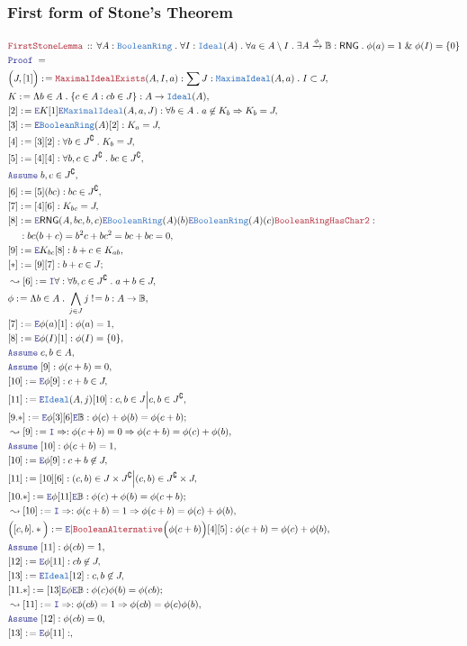 \documentclass[12pt]{scrartcl}
\newcommand{\TYPE}[1]{\textcolor{NavyBlue}{\mathtt{#1}}}
\newcommand{\LOGIC}[1]{\textcolor{Blue}{\mathtt{#1}}}
\newcommand{\THM}[1]{\textcolor{Maroon}{\mathtt{#1}}}
\renewcommand{\.}{\; . \;}
\newcommand{\de}{: \kern 0.1pc =}
\newcommand{\Theorem}[2]{& \THM{#1} \, :: \, #2 \\ & \Proof = \\ }
\newcommand{\NewLine}{\\ & \kern 1pc}
\newcommand{\Page}[1]{ \begin{align*} #1 \end{align*}   }
\renewcommand{\And}{\; \& \;}
\newcommand{\Imply}{\Rightarrow}
\newcommand{\Intro}{\LOGIC{I}}
\newcommand{\Elim}{\LOGIC{E}}
\newcommand{\Arrow}{\xrightarrow}
\renewcommand{\c}{\complement}
\newcommand{\Say}[3]{& #1 \de #2 : #3, \\}
\newcommand{\Conclude}[3]{& #1 \de #2 : #3; \\}
\newcommand{\Derive}[3]{& \leadsto #1 \de #2 : #3, \\}
\newcommand{\Assume}[2]{& \LOGIC{Assume} \; #1 : #2, \\}
\newcommand{\AssumeIn}[2]{& \LOGIC{Assume} \; #1 \in #2, \\}
\newcommand{\Proof}{\LOGIC{Proof} \; }
\newcommand{\Ideal}{\TYPE{Ideal}}
\newcommand{\RNG}{\mathsf{RNG}}
\newcommand{\Bool}{\mathbb{B}}
\newcommand{\BR}{\TYPE{BooleanRing}}
\begin{document}
\subsubsection{First form of Stone's Theorem}
\Page{
	\Theorem{FirstStoneLemma}
	{
		\forall A : \BR \.
		\forall I : \Ideal(A) \.
		\forall a \in  A \setminus I \.
		\exists A \Arrow{\phi} \Bool : \RNG \.
		\phi(a) = 1 \And \phi(I) = \{0\}
	}
	\Say{\Big(J,[1]\Big)}{\THM{MaximalIdealExists}(A,I,a)}
	{
		\sum J : \TYPE{MaximaIdeal}(A,a) \. 
		I \subset J 
	}
	\Say{K}{\Lambda b \in A \.  \{ c \in A : cb \in J  \}}{A \to \Ideal(A)}
	\Say{[2]}{\Elim K [1] \Elim \TYPE{MaximalIdeal}(A,a,J)}
	{
		\forall b \in A \.
		a \not \in K_b \Imply K_b = J
	}
	\Say{[3]}{\Elim \BR(A)[2]}
	{
		K_a = J
	}
	\Say{[4]}{[3][2]}{ \forall b \in J^\c \. K_b = J}
	\Say{[5]}{[4][4]}{\forall b,c \in J^\c \. bc \in J^\c}
	\AssumeIn{b,c}{J^\c}
	\Say{[6]}{[5](bc)}{bc \in J^\c}
	\Say{[7]}{[4][6]}{K_{bc} = J}
	\Say{[8]}{ 
		\Elim \RNG(A,bc,b,c)  
		\Elim \BR(A)(b)
		\Elim \BR(A)(c)
		\THM{BooleanRingHasChar2}
	}
	{
		\NewLine :
		bc(b + c) = 
		b^2 c + bc^2 =
		bc + bc =
		0
	}
	\Say{[9]}{\Elim K_{bc}[8]}{b + c \in K_{ab}}
	\Conclude{[*]}{[9][7]}{b + c \in J}
	\Derive{[6]}{\Intro \forall}{\forall b,c \in J^\c \. a + b \in J}
	\Say{\phi}{\Lambda b \in A \. \bigwedge_{j \in J} j\; !\!= b}{A \to \Bool}
	\Say{[7]}{\Elim \phi(a) [1]}{\phi(a) = 1}
	\Say{[8]}{\Elim \phi(I) [1]}{\phi(I) = \{0\}}
	\AssumeIn{c,b}{A}
	\Assume{[9]}{\phi(c + b) = 0 }
	\Say{[10]}{\Elim \phi [9]}
	{
		c + b \in J
	}
	\Say{[11]}{\Elim \TYPE{Ideal}(A,j)[10]}
	{
		c,b \in J \Big| c,b \in J^\c 
	}
	\Conclude{[9.*]}{\Elim \phi [3][6] \Elim \Bool }{\phi(c) + \phi(b) = \phi(c + b)}
	\Derive{[9]}{\Intro \Imply}
	{
		\phi(c+b)=0 \Imply \phi(c + b) = \phi(c) + \phi(b)
	}
	\Assume{[10]}{\phi(c + b) = 1}
	\Say{[10]}{\Elim \phi [9]}
	{
		c + b  \not \in J
	}
	\Say{[11]}{[10][6]}
	{
		(c,b) \in J \times J^\c \Big| (c,b) \in J^\c \times J 
	}
	\Conclude{[10.*]}{ \Elim \phi [11] \Elim \Bool  }{\phi(c) + \phi(b) = \phi(c + b)}
	\Derive{[10]}{\Intro \Imply}
	{
		\phi(c + b) = 1 \Imply\phi(c + b) = \phi(c) + \phi(b)
	}
	\Say{\Big([c,b].*\Big)}{\Elim | \THM{BooleanAlternative}\Big( \phi(c +b) \Big)[4][5]} 
	{
		\phi(c + b) = \phi(c) + \phi(b)
	}
	\Assume{[11]}{\phi(cb) = 1}
	\Say{[12]}{\Elim \phi [11]}
	{
		cb  \not \in J
	}
	\Say{[13]}{\Elim \Ideal[12]}{c,b \not \in J}
	\Conclude{[11.*]}{ [13]\Elim \phi \Elim \Bool}{\phi(c)\phi(b) = \phi(cb)}
	\Derive{[11]}{\Intro \Imply}
	{
		\phi(cb)=1 \Imply \phi(cb) = \phi(c)\phi(b)
	}
	\Assume{[12]}{\phi(cb) = 0}
	\Say{[13]}{\Elim \phi [11]}
	{
}}
\end{document}
